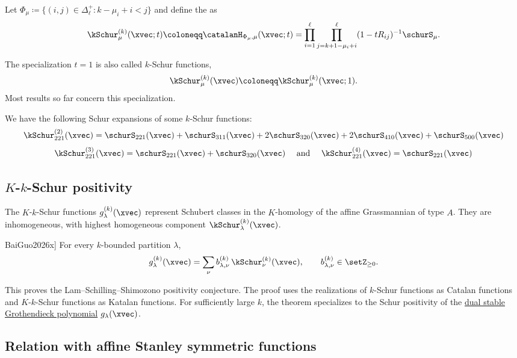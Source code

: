 Let $\Phi_\mu \coloneqq \{ (i,j) \in \Delta_\ell^+ : k-\mu_i+i \lt j \}$ and define the
 as
\[
\kSchur^{(k)}_\mu(\xvec;t) \coloneqq \catalanH_{\Phi_\mu,\mu}(\xvec;t) =
\prod_{i=1}^\ell \prod_{j=k+1-\mu_i+i}^\ell (1-tR_{ij})^{-1} \schurS_\mu.
\]

The specialization $t=1$ is also called $k$-Schur functions,
\[
\kSchur^{(k)}_\mu(\xvec) \coloneqq \kSchur^{(k)}_\mu(\xvec;1).
\]
Most results so far concern this specialization.

\begin{example}
We have the following Schur expansions of some $k$-Schur functions:
\[
\kSchur^{(2)}_{221}(\xvec)
=
\schurS_{221}(\xvec)+\schurS_{311}(\xvec)+2\schurS_{320}(\xvec)
+2\schurS_{410}(\xvec)+\schurS_{500}(\xvec)
\]
\[
\kSchur^{(3)}_{221}(\xvec)
=
\schurS_{221}(\xvec)+\schurS_{320}(\xvec)\quad \text{ and } \quad
\kSchur^{(4)}_{221}(\xvec) = \schurS_{221}(\xvec)
\]
\end{example}


\subsection[kKSchurPositivity]{$K$-$k$-Schur positivity}

The $K$-$k$-Schur functions $g^{(k)}_\lambda(\xvec)$ represent Schubert
classes in the $K$-homology of the affine Grassmannian of type $A$.  They are
inhomogeneous, with highest homogeneous component
$\kSchur^{(k)}_\lambda(\xvec)$.

\begin{theorem}[Bai--Guo, \cite[Thm.~1.1]{BaiGuo2026x}]
For every $k$-bounded partition $\lambda$,
\[
g^{(k)}_\lambda(\xvec)
=
\sum_\nu b^{(k)}_{\lambda,\nu}\,
\kSchur^{(k)}_\nu(\xvec),
\qquad
b^{(k)}_{\lambda,\nu}\in\setZ_{\geq0}.
\]
\end{theorem}

This proves the Lam--Schilling--Shimozono positivity conjecture.  The proof
uses the realizations of $k$-Schur functions as Catalan functions and
$K$-$k$-Schur functions as Katalan functions.  For sufficiently large $k$,
the theorem specializes to the Schur positivity of the
\hyperref[grothendieckDualStable]{dual stable Grothendieck polynomial}
$g_\lambda(\xvec)$.


\subsection[kSchurDuality]{Relation with affine Stanley symmetric functions}

